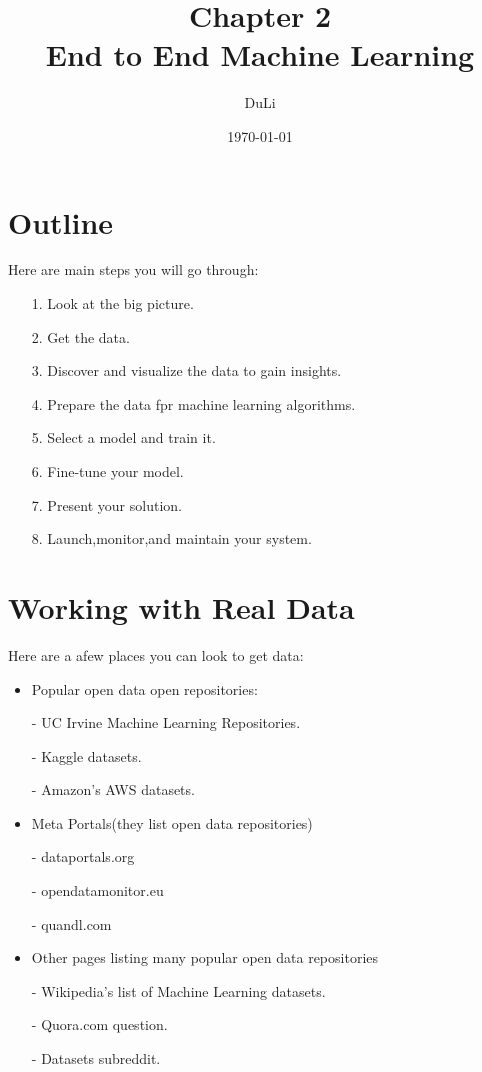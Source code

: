 \documentclass[UTF8]{ctexart}
\title{Chapter 2 \\End to End Machine Learning}
\author{DuLi}
\date{\today}
\begin{document}
\maketitle
\newpage
\tableofcontents
\newpage
\section{Outline}
\setlength{\parskip}{0.5em} 

Here are main steps you will go through:
\begin{itemize}
	\item[1.] Look at the big picture.
	\item[2.] Get the data.
	\item[3.] Discover and visualize the data to gain insights.
	\item[4.] Prepare the data fpr machine learning algorithms.
	\item[5.] Select a model and train it.
	\item[6.] Fine-tune your model.
	\item[7.] Present your solution.
	\item[8.] Launch,monitor,and maintain your system.
\end{itemize}
\section{Working with Real Data}
Here are a afew places you can look to get data:
\begin{itemize}
	\item Popular open data open repositories:
		\item[-] UC Irvine Machine Learning Repositories.
		\item[-] Kaggle datasets.
		\item[-] Amazon's AWS datasets.
	\item Meta Portals(they list open data repositories)
		\item[-] dataportals.org
		\item[-] opendatamonitor.eu
		\item[-] quandl.com
	\item Other pages listing many popular open data repositories
		\item[-] Wikipedia's list of Machine Learning datasets.
		\item[-] Quora.com question.
		\item[-] Datasets subreddit.
\end{itemize}
\end{document}
